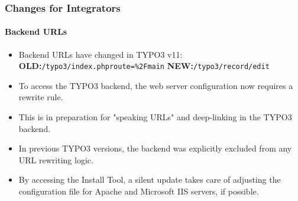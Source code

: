 %

\begin{frame}[fragile]
	\frametitle{Changes for Integrators}
	\framesubtitle{Backend URLs}

	\begin{itemize}
		\item Backend URLs have changed in TYPO3 v11:\newline
			\small
				\textbf{OLD:}\tabto{2cm}\texttt{/typo3/index.php\?route=\%2Fmain}\newline
				\textbf{NEW:}\tabto{2cm}\texttt{/typo3/record/edit}
			\normalsize

		\item To access the TYPO3 backend, the web server configuration now
			requires a rewrite rule.
		\item This is in preparation for "speaking URLs" and deep-linking in the
			TYPO3 backend.
		\item In previous TYPO3 versions, the backend was explicitly excluded
			from any URL rewriting logic.
		\item By accessing the Install Tool, a silent update takes care of
			adjusting the configuration file for Apache and Microsoft IIS
			servers, if possible.

	\end{itemize}
\end{frame}

